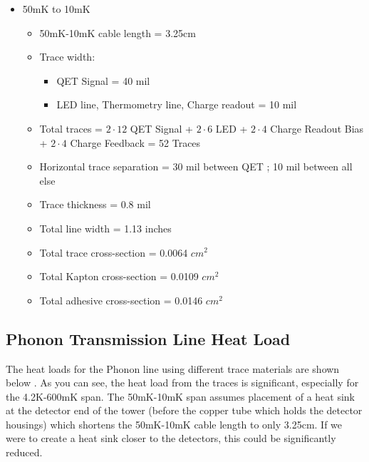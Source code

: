 \documentclass{report}
\begin{document}
\begin{itemize}
\item 50mK to 10mK
    \begin{itemize}
    \item 50mK-10mK cable length = 3.25cm
    \item Trace width:
        \begin{itemize}
        \item QET Signal = 40 mil
        \item LED line, Thermometry line, Charge readout = 10 mil
        \end{itemize}
    \item Total traces = $2\cdot12$ QET Signal + $2\cdot6$ LED + $2\cdot4$ Charge Readout Bias + $2\cdot4$ Charge Feedback = 52 Traces
    \item Horizontal trace separation = 30 mil between QET ; 10 mil between all else
    \item Trace thickness = 0.8 mil
    \item Total line width = 1.13 inches
    \item Total trace cross-section = 0.0064 $cm^2$
    \item Total Kapton cross-section = 0.0109 $cm^2$
    \item Total adhesive cross-section = 0.0146 $cm^2$
    \end{itemize}
\end{itemize}

\subsection{Phonon Transmission Line Heat Load}

The heat loads for the Phonon line using different trace materials are shown below \footnotemark. As you can see, the heat load from the traces is significant, especially for the 4.2K-600mK span.
The 50mK-10mK span assumes placement of a heat sink at the detector end of the tower (before the copper tube which holds the detector housings) which shortens the 50mK-10mK cable length to only 3.25cm. If we were to create a heat sink closer to the detectors, this could be significantly reduced.
\end{document}

